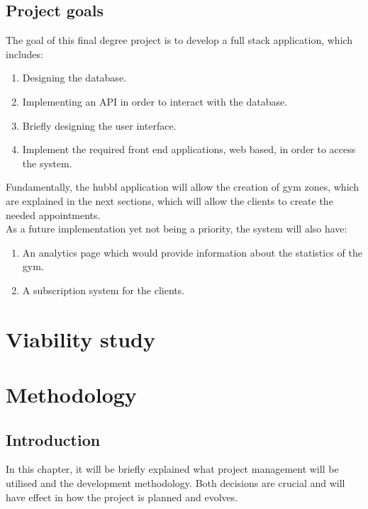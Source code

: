 \documentclass[a4paper, 12pt, oneside]{book}
\begin{document}
\section{Project goals}
The goal of this final degree project is to develop a full stack application, which includes:
\begin{enumerate}[label = -]
	\item Designing the database.
	\item Implementing an API in order to interact with the database.
	\item Briefly designing the user interface.
	\item Implement the required front end applications, web based, in order to access the system.
\end{enumerate}
Fundamentally, the hubbl application will allow the creation of gym zones, which are explained in the next sections, which will allow the clients to create the needed appointments.
\\[8pt]
As a future implementation yet not being a priority, the system will also have:
\begin{enumerate}[label = -]
	\item An analytics page which would provide information about the statistics of the gym.
	\item A subscription system for the clients.
\end{enumerate}
\chapter{Viability study}
\chapter{Methodology}
\section{Introduction}
In this chapter, it will be briefly explained what project management will be utilised and the development methodology. Both decisions are crucial and will have effect in how the project is planned and evolves.
\end{document}
